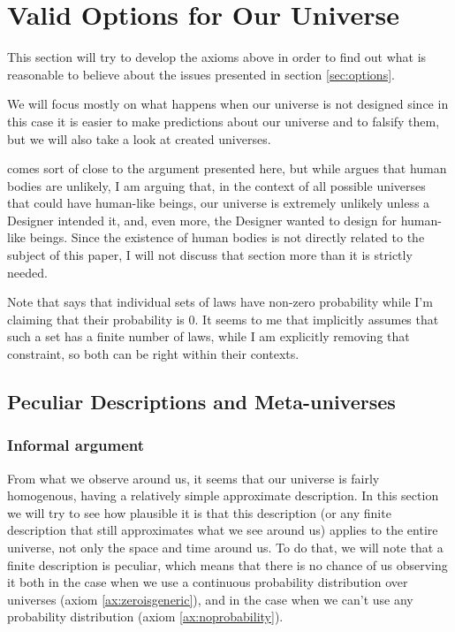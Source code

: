 \documentclass[a4paper
]{article}
\newcommand{\paper}[1]{paper}
\newcommand{\ghilimele}[1]{``#1"}
\begin{document}
\section{Valid Options for Our Universe}
\label{sec:valid-options}

This section will try to develop the axioms above in order to find out what
is reasonable to believe about the issues presented in
section \ref{sec:options}.

We will focus mostly on what happens when our universe is not designed
since in this case it is easier to make predictions about our universe
and to falsify them, but we will also take a look at created universes.

\textcite[][Section \ghilimele{Why a world with human bodies is unlikely
if there is no God}]{Swinburne2003} comes sort of close to the argument
presented here, but while \citeauthor{Swinburne2003}
argues that human bodies are unlikely, I am arguing that, in the context
of all possible universes that could have human-like beings,
our universe is extremely unlikely unless a Designer intended it,
and, even more, the Designer wanted to design for human-like
beings.
Since the existence of human bodies is not directly related to the subject
of this \paper{}, I will not discuss that section more
than it is strictly needed.

Note that  \citeauthor{Swinburne2003} says that individual sets of laws
have non-zero probability while I'm claiming that their probability is $0$.
It seems to me that \citeauthor{Swinburne2003} implicitly assumes that
such a set has a finite number of laws, while I am explicitly removing
that constraint, so both can be right within their contexts.

\subsection{Peculiar Descriptions and Meta-universes}
\label{fdaumu}

\subsubsection{Informal argument}

From what we observe around us, it seems that our universe is fairly homogenous,
having a relatively simple approximate description.
In this section we will try to see how plausible it is that this description
(or any finite description that still approximates what we see around us)
applies to the entire universe, not only the space and time around us.
To do that, we will note that a finite description is peculiar,
which means that there is no chance of
us observing it both in the case when we use a continuous probability
distribution over universes (axiom \ref{ax:zeroisgeneric}),
and in the case when we can't use any probability
distribution (axiom \ref{ax:noprobability}).
\end{document}
